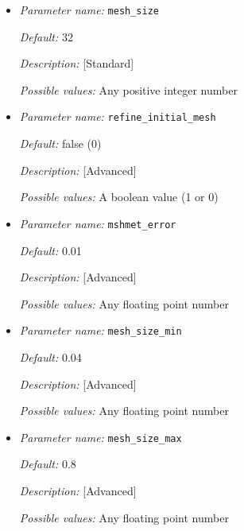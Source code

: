 \begin{itemize}
{\it Description:} [Standard] 

{\it Possible values:} Any positive floating point number 


\item {\it Parameter name:} {\tt mesh\_size}
\label{parameters:mesh_size}


{\it Default:} 32

{\it Description:} [Standard] 

{\it Possible values:} Any positive integer number 


\item {\it Parameter name:} {\tt refine\_initial\_mesh}
\label{parameters:refine_initial_mesh}


{\it Default:} false (0)

{\it Description:} [Advanced] 

{\it Possible values:} A boolean value (1 or 0)


\item {\it Parameter name:} {\tt mshmet\_error}
\label{parameters:mshmet_error}


{\it Default:} 0.01

{\it Description:} [Advanced] 

{\it Possible values:} Any floating point number


\item {\it Parameter name:} {\tt mesh\_size\_min}
\label{parameters:mesh_size_min}


{\it Default:} 0.04

{\it Description:} [Advanced] 

{\it Possible values:} Any floating point number


\item {\it Parameter name:} {\tt mesh\_size\_max}
\label{parameters:mesh_size_max}


{\it Default:} 0.8

{\it Description:} [Advanced] 

{\it Possible values:} Any floating point number

\end{itemize}



